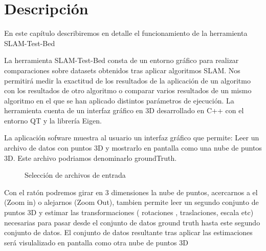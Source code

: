 \chapter{Descripción} \label{cap:Descripcion}
En este capítulo describiremos en detalle el funcionamiento de la herramienta SLAM-Test-Bed

La herramienta SLAM-Test-Bed consta de un entorno gráfico para realizar comparaciones sobre datasets obtenidos tras aplicar algoritmos SLAM. 
Nos permitirá medir la exactitud de los resultados de la aplicación de un algoritmo con los resultados de otro algoritmo o comparar varios resultados de un mismo algoritmo en el que se han aplicado distintos parámetros de ejecución.
La herramienta cuenta de un interfaz gráfico en 3D desarrollado en C++ con el entorno QT y la librería Eigen.


La aplicación sofware muestra al usuario un interfaz gráfico que permite:
Leer un archivo de datos con puntos 3D y mostrarlo en pantalla como una nube de puntos 3D. Este archivo podriamos denominarlo groundTruth.
\begin{figure}[H]
\begin{center}
\hspace{0.5cm}
\end{center}
\caption{Selección de archivos de entrada }
\end{figure}

Con el ratón podremos girar en 3 dimensiones  la nube de puntos, acercarnos a el (Zoom in) o alejarnos (Zoom Out),
tambien permite leer un segundo conjunto de puntos 3D y estimar las transformaciones ( rotaciones , traslaciones, escala etc)  necesarias para pasar desde el conjunto de datos ground truth hasta este segundo conjunto de datos. El conjunto de datos resultante tras aplicar las estimaciones será visulalizado en pantalla como otra nube de puntos 3D


